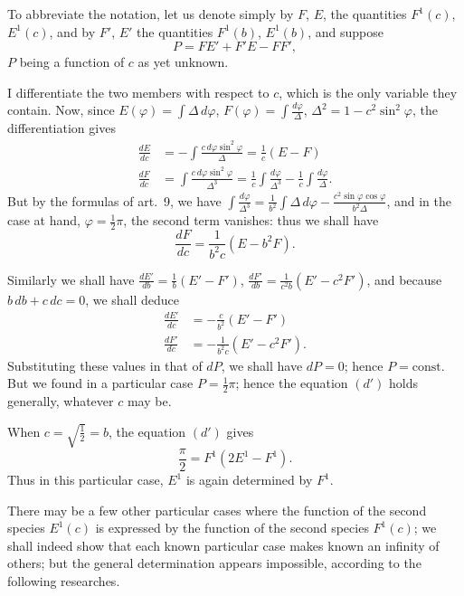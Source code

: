 \documentclass{article}
\begin{document}
To abbreviate the notation, let us denote simply by $F$, $E$, the quantities $F^{1}(c)$, $E^{1}(c)$, and by $F'$, $E'$ the quantities $F^{1}(b)$, $E^{1}(b)$, and suppose
\[ P=FE'+F'E-FF', \]
$P$ being a function of $c$ as yet unknown.

I differentiate the two members with respect to $c$, which is the only variable they contain. Now, since $E(\varphi)=\displaystyle\int\Delta\,d\varphi$, $F(\varphi)=\displaystyle\int\frac{d\varphi}{\Delta}$, $\Delta^{2}=1-c^{2}\sin^{2}\varphi$, the differentiation gives
\[ \begin{aligned} \frac{dE}{dc}&=-\int\frac{c\,d\varphi\sin^{2}\varphi}{\Delta}=\frac{1}{c}(E-F)\\ \frac{dF}{dc}&=\int\frac{c\,d\varphi\sin^{2}\varphi}{\Delta^{3}}=\frac{1}{c}\int\frac{d\varphi}{\Delta^{3}}-\frac{1}{c}\int\frac{d\varphi}{\Delta}. \end{aligned} \]
But by the formulas of art.\ 9, we have $\displaystyle\int\frac{d\varphi}{\Delta^{3}}=\frac{1}{b^{2}}\displaystyle\int\Delta\,d\varphi-\frac{c^{2}\sin\varphi\cos\varphi}{b^{2}\Delta}$, and in the case at hand, $\varphi=\frac{1}{2}\pi$, the second term vanishes: thus we shall have
\[ \frac{dF}{dc}=\frac{1}{b^{2}c}(E-b^{2}F). \]

Similarly we shall have $\frac{dE'}{db}=\frac{1}{b}(E'-F')$, $\frac{dF'}{db}=\frac{1}{c^{2}b}(E'-c^{2}F')$, and because $b\,db+c\,dc=0$, we shall deduce
\[ \begin{aligned} \frac{dE'}{dc}&=-\frac{c}{b^{2}}(E'-F')\\ \frac{dF'}{dc}&=-\frac{1}{b^{2}c}(E'-c^{2}F'). \end{aligned} \]
Substituting these values in that of $dP$, we shall have $dP=0$; hence $P=\text{const.}$ But we found in a particular case $P=\frac{1}{2}\pi$; hence the equation $(d')$ holds generally, whatever $c$ may be.

When $c=\sqrt{\frac{1}{2}}=b$, the equation $(d')$ gives
\[ \frac{\pi}{2}=F^{1}(2E^{1}-F^{1}). \]
Thus in this particular case, $E^{1}$ is again determined by $F^{1}$.

There may be a few other particular cases where the function of the second species $E^{1}(c)$ is expressed by the function of the second species $F^{1}(c)$; we shall indeed show that each known particular case makes known an infinity of others; but the general determination appears impossible, according to the following researches.
\end{document}
